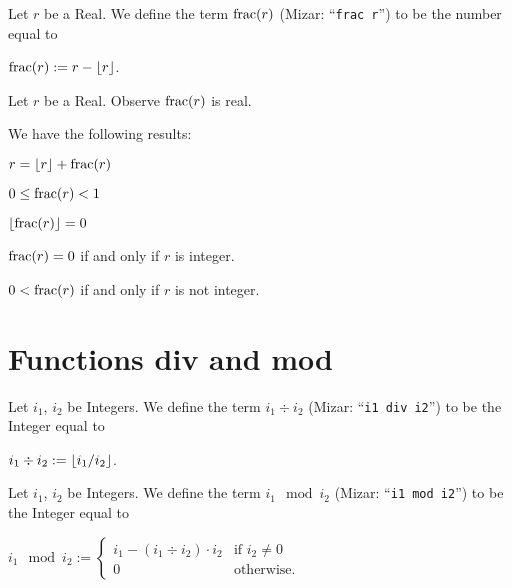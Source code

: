 \documentclass{article}
\begin{document}
\begin{definition}
Let $r$ be a Real.
We define the term $\operatorname{frac}(r)$ (Mizar: ``\verb#frac r#'') to be the
number equal to
\begin{defn}
\item $\operatorname{frac}(r):=r-\lfloor r \rfloor$.
\end{defn}
\end{definition}

Let $r$ be a Real. Observe $\operatorname{frac}(r)$ is real.

We have the following results:
\begin{thm}
\item\label{int1:42} $r=\lfloor r \rfloor+\operatorname{frac}(r)$
\item\label{int1:43} $0\leq\operatorname{frac}(r)<1$
\item\label{int1:44} $\lfloor \operatorname{frac}(r) \rfloor=0$
\item\label{int1:45} $\operatorname{frac}(r)=0$ if and only if $r$ is integer.
\item\label{int1:46} $0<\operatorname{frac}(r)$ if and only if $r$ is not integer.
\end{thm}

\section{Functions div and mod}

\begin{definition}
Let $i_{1}$, $i_{2}$ be Integers.
We define the term $i_{1}\div i_{2}$ (Mizar: ``\verb#i1 div i2#'') to be
the Integer equal to
\begin{defn}
\item $i_{1}\div i_{2}:=\lfloor i_{1}/i_{2} \rfloor$.
\end{defn}
\end{definition}

\begin{definition}
Let $i_{1}$, $i_{2}$ be Integers.
We define the term $i_{1}\mod{i_{2}}$ (Mizar: ``\verb#i1 mod i2#'') to
be the Integer equal to
\begin{defn}
\item $\displaystyle{i_{1}\mod{i_{2}}:=\begin{cases}
  i_{1}-(i_{1}\div i_{2})\cdot i_{2} &\mbox{if }i_{2}\neq0\\
  0 & \mbox{otherwise}.
  \end{cases}}$
  \end{defn}
\end{definition}
\end{document}

